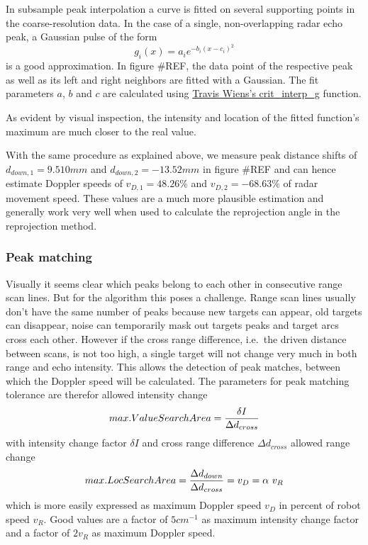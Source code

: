 In subsample peak interpolation a curve is fitted on several supporting
points in the coarse-resolution data. In the case of a single,
non-overlapping radar echo peak, a Gaussian pulse of the form
\[g_i(x) = a_i e^{-b_i ( x - c_i )^2}\] is a good approximation. In
figure \#REF, the data point of the respective peak as well as its left
and right neighbors are fitted with a Gaussian. The fit parameters
\(a\), \(b\) and \(c\) are calculated using
\href{https://www.mathworks.com/matlabcentral/fileexchange/24465}{Travis
Wiens's crit\_interp\_g} function.

As evident by visual inspection, the intensity and location of the
fitted function's maximum are much closer to the real value.

With the same procedure as explained above, we measure peak distance
shifts of \(d_{down,1}=9.510mm\) and \(d_{down,2}=-13.52mm\) in figure
\#REF and can hence estimate Doppler speeds of \(v_{D,1}=48.26\%\) and
\(v_{D,2}=-68.63\%\) of radar movement speed. These values are a much
more plausible estimation and generally work very well when used to
calculate the reprojection angle in the reprojection method.

\subsubsection{Peak matching}\label{peak-matching}

Visually it seems clear which peaks belong to each other in consecutive
range scan lines. But for the algorithm this poses a challenge. Range
scan lines usually don't have the same number of peaks because new
targets can appear, old targets can disappear, noise can temporarily
mask out targets peaks and target arcs cross each other. However if the
cross range difference, i.e.~the driven distance between scans, is not
too high, a single target will not change very much in both range and
echo intensity. This allows the detection of peak matches, between which
the Doppler speed will be calculated. The parameters for peak matching
tolerance are therefor allowed intensity change
\[max. ValueSearchArea = {\delta I\over{\Delta d_{cross}}}\] with
intensity change factor \(\delta I\) and cross range difference
\(\Delta d_{cross}\) allowed range change
\[max. LocSearchArea = {\Delta d_{down}\over{\Delta d_{cross}}} = v_D = \alpha~v_R\]
which is more easily expressed as maximum Doppler speed \(v_D\) in
percent of robot speed \(v_R\). Good values are a factor of
\(5 cm^{-1}\) as maximum intensity change factor and a factor of
\(2 v_R\) as maximum Doppler speed.

